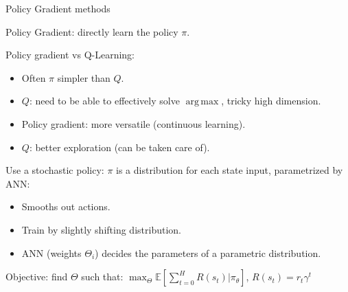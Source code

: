 \documentclass{beamer}
\DeclareMathOperator*{\argmax}{arg\,max}
\begin{document}
\begin{frame}{Policy Gradient methods}

\begin{center}
    Policy Gradient: directly learn the policy $\pi$.
  \end{center}

  Policy gradient vs Q-Learning:
  \begin{itemize}
    \item Often $\pi$ simpler than $Q$.
    \item $Q$: need to be able to effectively solve $\argmax$, tricky high dimension.
    \item Policy gradient: more versatile (continuous learning).
    \item $Q$: better exploration (can be taken care of).
  \end{itemize}
 
  Use a stochastic policy: $\pi$ is a distribution for each state input, parametrized by ANN:
  \begin{itemize}
    \item Smooths out actions.
    \item Train by slightly shifting distribution.
    \item ANN (weights $\Theta_i$) decides the parameters of a parametric distribution.
  \end{itemize}

  \begin{center}
    Objective: find $\Theta$ such that: $\max_{\Theta} \mathbb{E} \left[ \sum_{t=0}^{H} R(s_t) | \pi_{\theta} \right]$, $R(s_t) = r_t \gamma^t$
  \end{center}

\end{frame}
\end{document}
